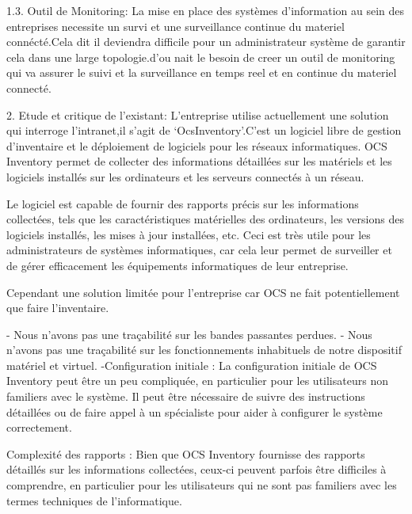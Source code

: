 \documentclass{report}
\begin{document}
1.3. Outil de Monitoring:
La mise en place des systèmes d'information au sein des entreprises necessite un survi et une surveillance continue du materiel connécté.Cela dit il deviendra difficile pour un administrateur système de garantir cela dans une large topologie.d'ou nait le besoin de creer un outil de monitoring qui va assurer le suivi et la surveillance en temps reel et en continue du materiel connecté.

2. Etude et critique de l’existant:
L'entreprise utilise actuellement une solution qui interroge l’intranet,il s'agit de ‘OcsInventory’.C'est un logiciel libre de gestion d'inventaire et le déploiement de logiciels pour les réseaux informatiques. OCS Inventory permet de collecter des informations détaillées sur les matériels et les logiciels installés sur les ordinateurs et les serveurs connectés à un réseau.

Le logiciel est capable de fournir des rapports précis sur les informations collectées, tels que les caractéristiques matérielles des ordinateurs, les versions des logiciels installés, les mises à jour installées, etc. Ceci est très utile pour les administrateurs de systèmes informatiques, car cela leur permet de surveiller et de gérer efficacement les équipements informatiques de leur entreprise.

Cependant une solution limitée pour l'entreprise car OCS ne fait potentiellement que faire l’inventaire.

- Nous n’avons pas une traçabilité sur les bandes passantes perdues.
- Nous n’avons pas une traçabilité sur les fonctionnements inhabituels de notre
dispositif matériel et virtuel.
-Configuration initiale : La configuration initiale de OCS Inventory peut être un peu compliquée, en particulier pour les utilisateurs non familiers avec le système. Il peut être nécessaire de suivre des instructions détaillées ou de faire appel à un spécialiste pour aider à configurer le système correctement.

Complexité des rapports : Bien que OCS Inventory fournisse des rapports détaillés sur les informations collectées, ceux-ci peuvent parfois être difficiles à comprendre, en particulier pour les utilisateurs qui ne sont pas familiers avec les termes techniques de l'informatique.
\end{document}
